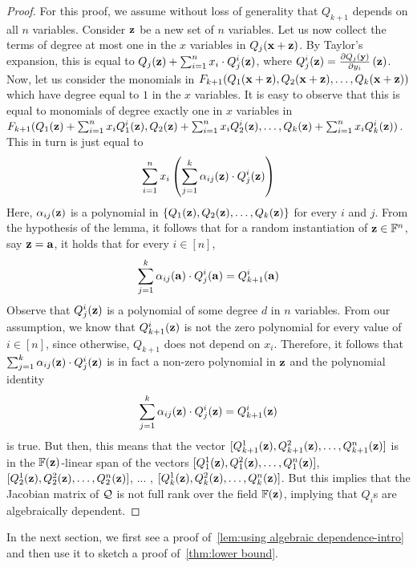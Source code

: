 \begin{proof}
For this proof, we assume without loss of generality that $Q_{k+1}$ depends on all $n$ variables. Consider $\mathbf{z}$ be a new set of $n$ variables. Let us now collect the terms of degree at most one in the $x$ variables in $Q_{j}(\mathbf{x} + \mathbf{z})$. By Taylor's expansion, this is equal to $Q_j(\mathbf{z}) + \sum_{i = 1}^n x_i\cdot Q^i_j(\mathbf{z})$, where $ Q^i_j(\mathbf{z}) = \frac{\partial Q_{j}(\mathbf{y})}{\partial y_i}\left(\mathbf{z} \right)$. 
Now, let us consider the monomials  in  $F_{k+1}(Q_1(\mathbf{x} + \mathbf{z}), Q_2(\mathbf{x} + \mathbf{z}), \ldots, Q_k(\mathbf{x} + \mathbf{z}))$ which have degree equal to $1$ in the $x$ variables. It is easy to observe that this is equal to monomials of degree exactly one in $x$ variables in  $F_{k+1}(Q_1(\mathbf{z})+\sum_{i = 1}^n x_iQ^i_1(\mathbf{z}) ,Q_2(\mathbf{z}) + \sum_{i = 1}^n x_iQ^i_2(\mathbf{z}), \ldots, Q_k(\mathbf{z}) + \sum_{i = 1}^n x_iQ^i_k(\mathbf{z}))$. This in turn is just equal to 
\[
\sum_{i = 1}^n x_i\left( \sum_{j = 1}^k \alpha_{ij}(\mathbf{z}) \cdot Q^i_j(\mathbf{z}) \right)
\]
Here, $\alpha_{ij}(\mathbf{z})$ is a polynomial in $\{Q_1(\mathbf{z}), Q_2(\mathbf{z}), \ldots, Q_k(\mathbf{z})\}$ for every $i$ and $j$. From the hypothesis of the lemma, it follows that for a random instantiation of $\mathbf{z} \in \mathbb{F}^n$, say $\mathbf{z} = \mathbf{a}$, it holds that for every $i\in [n]$,
\[
\sum_{j = 1}^k \alpha_{ij}(\mathbf{a})\cdot Q^i_j(\mathbf{a}) = Q^i_{k+1}(\mathbf{a})
\]
Observe that $Q^{i}_j(\mathbf{z})$ is a polynomial of some degree $d$ in $n$ variables. From our assumption, we know that $Q^{i}_{k+1}(\mathbf{z})$ is not the zero polynomial for every value of $i \in [n]$, since otherwise, $Q_{k+1}$ does not depend on $x_i$. Therefore, it follows that $\sum_{j = 1}^k \alpha_{ij}(\mathbf{z})\cdot Q^i_j(\mathbf{z})$ is in fact a non-zero polynomial in $\mathbf{z}$ and the polynomial identity 
\[
\sum_{j = 1}^k \alpha_{ij}(\mathbf{z})\cdot Q^i_j(\mathbf{z}) = Q^i_{k+1}(\mathbf{z})
\]
is true. But then, this means that the vector $[Q^1_{k+1}(\mathbf{z}), Q^2_{k+1}(\mathbf{z}), \ldots, Q^n_{k+1}(\mathbf{z})]$ is in the $\mathbb{F}(\mathbf{z})$-linear span of the vectors $[Q^1_{1}(\mathbf{z}), Q^2_{1}(\mathbf{z}), \ldots, Q^n_{1}(\mathbf{z})]$, $[Q^1_{2}(\mathbf{z}), Q^2_{2}(\mathbf{z}), \ldots, Q^n_{2}(\mathbf{z})]$, ... , $[Q^1_{k}(\mathbf{z}), Q^2_{k}(\mathbf{z}), \ldots, Q^n_{k}(\mathbf{z})]$. But this implies that the Jacobian matrix of  ${\cal Q}$ is not full rank over the field $\mathbb{F}(\mathbf{z})$, implying that $Q_i$s are algebraically dependent. 

\end{proof}


In the next section, we first see a proof of~\autoref{lem:using algebraic dependence-intro} and then use it to sketch a proof of~\autoref{thm:lower bound}. 


